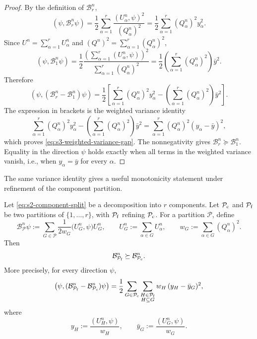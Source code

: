 \documentclass[10pt,onefignum,onetabnum,hidelinks]{siamart251216}
\begin{document}
\begin{proof}
By the definition of \(\mathcal B_r^n\),
\[
(\psi,\mathcal B_r^n\psi)
=
\frac12
\sum_{\alpha=1}^r
\frac{(U_\alpha^n,\psi)^2}{(Q_\alpha^n)^2}
=
\frac12
\sum_{\alpha=1}^r
(Q_\alpha^n)^2 y_\alpha^2 .
\]
Since \(U^n=\sum_{\alpha=1}^r U_\alpha^n\) and
\((Q^n)^2=\sum_{\alpha=1}^r (Q_\alpha^n)^2\),
\[
(\psi,\mathcal B_1^n\psi)
=
\frac12
\frac{\left(\sum_{\alpha=1}^r (U_\alpha^n,\psi)\right)^2}
{\sum_{\alpha=1}^r (Q_\alpha^n)^2}
=
\frac12
\left(\sum_{\alpha=1}^r (Q_\alpha^n)^2\right)\bar y^2 .
\]
Therefore
\[
\left(\psi,(\mathcal B_r^n-\mathcal B_1^n)\psi\right)
=
\frac12
\left[
\sum_{\alpha=1}^r (Q_\alpha^n)^2 y_\alpha^2
-
\left(\sum_{\alpha=1}^r (Q_\alpha^n)^2\right)\bar y^2
\right].
\]
The expression in brackets is the weighted variance identity
\[
\sum_{\alpha=1}^r (Q_\alpha^n)^2 y_\alpha^2
-
\left(\sum_{\alpha=1}^r (Q_\alpha^n)^2\right)\bar y^2
=
\sum_{\alpha=1}^r
(Q_\alpha^n)^2(y_\alpha-\bar y)^2,
\]
which proves \eqref{eq:s3-weighted-variance-gap}. The nonnegativity gives
\(\mathcal B_r^n\succeq\mathcal B_1^n\). Equality in the direction \(\psi\)
holds exactly when all terms in the weighted variance vanish, i.e., when
\(y_\alpha=\bar y\) for every \(\alpha\).
\end{proof}

The same variance identity gives a useful monotonicity statement under refinement of the component partition.

\begin{proposition}
\label{prop:refinement-monotonicity}
Let \eqref{eq:s2-component-split} be a decomposition into \(r\)
components. Let \(\mathcal P_{\rm c}\) and \(\mathcal P_{\rm f}\) be two
partitions of \(\{1,\dots,r\}\), with \(\mathcal P_{\rm f}\) refining
\(\mathcal P_{\rm c}\). For a partition \(\mathcal P\), define
\[
\mathcal B_{\mathcal P}^n\psi
:=
\sum_{G\in\mathcal P}
\frac{1}{2w_G}
\bigl(U_G^n,\psi\bigr)U_G^n,
\qquad
U_G^n:=\sum_{\alpha\in G}U_\alpha^n,
\qquad
w_G:=\sum_{\alpha\in G}(Q_\alpha^n)^2 .
\]
Then
\[
\mathcal B_{\mathcal P_{\rm f}}^n
\succeq
\mathcal B_{\mathcal P_{\rm c}}^n .
\]
More precisely, for every direction \(\psi\),
\begin{equation}
\bigl(\psi,(\mathcal B_{\mathcal P_{\rm f}}^n
-\mathcal B_{\mathcal P_{\rm c}}^n)\psi\bigr)
=
\frac12
\sum_{G\in\mathcal P_{\rm c}}
\sum_{\substack{H\in\mathcal P_{\rm f}\\ H\subseteq G}}
w_H\,(y_H-\bar y_G)^2,
\label{eq:s3-refinement-variance}
\end{equation}
where
\[
y_H:=\frac{(U_H^n,\psi)}{w_H},
\qquad
\bar y_G:=\frac{(U_G^n,\psi)}{w_G}.
\]
\end{proposition}
\end{document}
